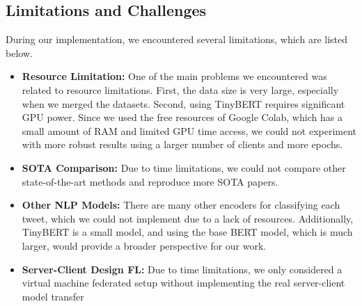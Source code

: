 \documentclass[11pt]{article}
\begin{document}
\subsection{Limitations and Challenges}
During our implementation, we encountered several limitations, which are listed below. 
\begin{itemize}
    \item \textbf{Resource Limitation:} One of the main problems we encountered was related to resource limitations. First, the data size is very large, especially when we merged the datasets. Second, using TinyBERT requires significant GPU power. Since we used the free resources of Google Colab, which has a small amount of RAM and limited GPU time access, we could not experiment with more robust results using a larger number of clients and more epochs.
    \item \textbf{SOTA Comparison:} Due to time limitations, we could not compare other state-of-the-art methods and reproduce more SOTA papers.
    \item \textbf{Other NLP Models:} There are many other encoders for classifying each tweet, which we could not implement due to a lack of resources. Additionally, TinyBERT is a small model, and using the base BERT model, which is much larger, would provide a broader perspective for our work.
    \item \textbf{Server-Client Design FL:}  Due to time limitations, we only considered a virtual machine federated setup without implementing the real server-client model transfer
\end{itemize}
\end{document}
